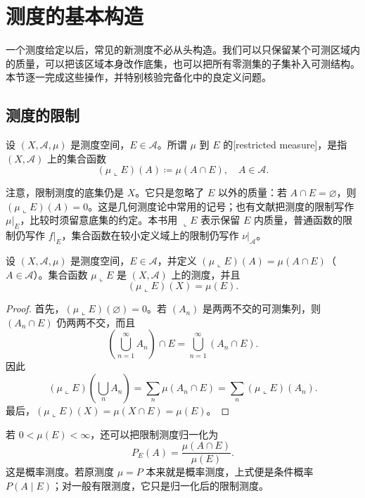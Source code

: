 \section{测度的基本构造}
\label{b1:sec:0202}

一个测度给定以后，常见的新测度不必从头构造。我们可以只保留某个可测区域内的质量，可以把该区域本身改作底集，也可以把所有零测集的子集补入可测结构。本节逐一完成这些操作，并特别核验完备化中的良定义问题。

\subsection{测度的限制}
\label{b1:subsec:020201}

\begin{definition}
\label{b1:def:restriction-measure}
设 \((X,\mathcal A,\mu)\) 是测度空间，\(E\in\mathcal A\)。所谓 \(\mu\) 到 \(E\) 的[restricted measure]，是指 \((X,\mathcal A)\) 上的集合函数
\[
(\mu\llcorner E)(A)\coloneqq\mu(A\cap E),
\quad A\in\mathcal A.
\]
\end{definition}

注意，限制测度的底集仍是 \(X\)。它只是忽略了 \(E\) 以外的质量：若 \(A\cap E=\varnothing\)，则 \((\mu\llcorner E)(A)=0\)。这是几何测度论中常用的记号；也有文献把测度的限制写作 \(\mu|_E\)，比较时须留意底集的约定。本书用 \(\llcorner E\) 表示保留 \(E\) 内质量，普通函数的限制仍写作 \(f|_E\)，集合函数在较小定义域上的限制仍写作 \(\nu|_{\mathcal A}\)。

\begin{proposition}
\label{b1:prop:restriction-measure}
设 \((X,\mathcal A,\mu)\) 是测度空间，\(E\in\mathcal A\)，并定义 \((\mu\llcorner E)(A)=\mu(A\cap E)\)（\(A\in\mathcal A\)）。集合函数 \(\mu\llcorner E\) 是 \((X,\mathcal A)\) 上的测度，并且
\[
(\mu\llcorner E)(X)=\mu(E).
\]
\end{proposition}
\begin{proof}
首先，\((\mu\llcorner E)(\varnothing)=0\)。若 \((A_n)\) 是两两不交的可测集列，则 \((A_n\cap E)\) 仍两两不交，而且
\[
\left(\bigcup_{n=1}^{\infty}A_n\right)\cap E
=\bigcup_{n=1}^{\infty}(A_n\cap E).
\]
因此
\[
(\mu\llcorner E)\left(\bigcup_nA_n\right)
=\sum_n\mu(A_n\cap E)
=\sum_n(\mu\llcorner E)(A_n).
\]
最后，\((\mu\llcorner E)(X)=\mu(X\cap E)=\mu(E)\)。
\end{proof}

若 \(0<\mu(E)<\infty\)，还可以把限制测度归一化为
\[
P_E(A)=\frac{\mu(A\cap E)}{\mu(E)}.
\]
这是概率测度。若原测度 \(\mu=P\) 本来就是概率测度，上式便是条件概率 \(P(A\mid E)\)；对一般有限测度，它只是归一化后的限制测度。

